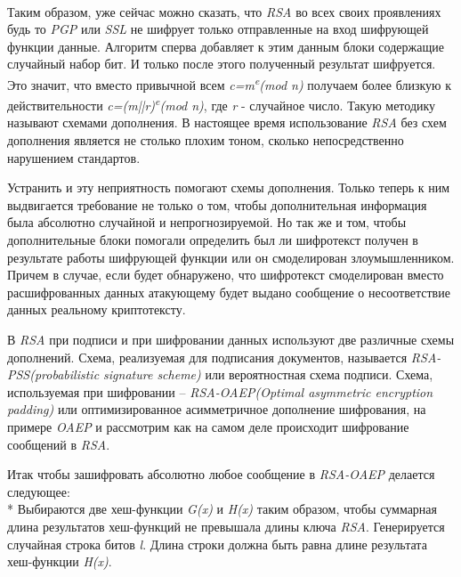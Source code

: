 \paragraph{} Таким образом, уже сейчас можно сказать, что \textit{RSA} во всех своих проявлениях будь то \textit{PGP} или \textit{SSL} не шифрует только отправленные на вход шифрующей функции данные. Алгоритм сперва добавляет к этим данным блоки содержащие случайный набор бит. И только после этого полученный результат шифруется. Это значит, что вместо привычной всем \textit{c=m\textsuperscript{e}(mod n)} получаем более близкую к действительности \textit{c=(m||r)\textsuperscript{e}(mod n)}, где \textit{r} - случайное число. Такую методику называют схемами дополнения. В настоящее время использование \textit{RSA} без схем дополнения является не столько плохим тоном, сколько непосредственно нарушением стандартов.

Устранить и эту неприятность помогают схемы дополнения. Только теперь к ним выдвигается требование не только о том, чтобы дополнительная информация была абсолютно случайной и непрогнозируемой. Но так же и том, чтобы дополнительные блоки помогали определить был ли шифротекст получен в результате работы шифрующей функции или он смоделирован злоумышленником. Причем в случае, если будет обнаружено, что шифротекст смоделирован вместо расшифрованных данных атакующему будет выдано сообщение о несоответствие данных реальному криптотексту.

В \textit{RSA} при подписи и при шифровании данных используют две различные схемы дополнений. Схема, реализуемая для подписания документов, называется \textit{RSA-PSS(probabilistic signature scheme)} или вероятностная схема подписи. Схема, используемая при шифровании – \textit{RSA-OAEP(Optimal asymmetric encryption padding)} или оптимизированное асимметричное дополнение шифрования, на примере \textit{OAEP} и рассмотрим как на самом деле происходит шифрование сообщений в \textit{RSA}.

Итак чтобы зашифровать абсолютно любое сообщение в \textit{RSA-OAEP} делается следующее: \\*
Выбираются две хеш-функции \textit{G(x)} и \textit{H(x)} таким образом, чтобы суммарная длина результатов хеш-функций не превышала длины ключа \textit{RSA}. Генерируется случайная строка битов \textit{l}. Длина строки должна быть равна длине результата хеш-функции \textit{H(x)}.

